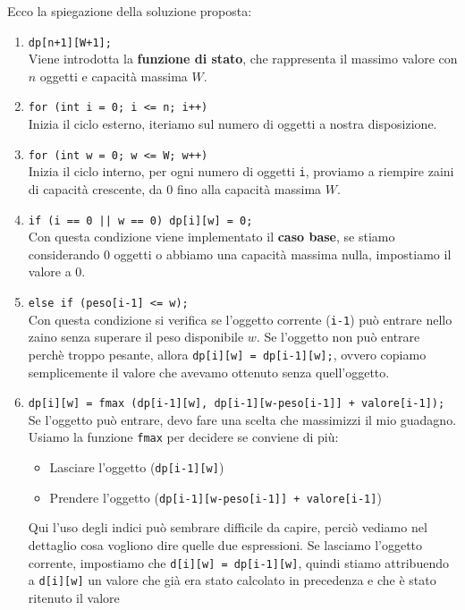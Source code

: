 \noindent Ecco la spiegazione della soluzione proposta:
\begin{enumerate}
    \item \texttt{dp[n+1][W+1];}\\
    Viene introdotta la \textbf{funzione di stato}, che rappresenta il massimo valore con $n$ oggetti
    e capacità massima $W$.
    \item \texttt{for (int i = 0; i <= n; i++)}\\ 
    Inizia il ciclo esterno, iteriamo sul numero di oggetti a nostra disposizione.
    \item \texttt{for (int w = 0; w <= W; w++)}\\ %
    Inizia il ciclo interno, per ogni numero di oggetti \texttt{i}, proviamo a
    riempire zaini di capacità crescente, da $0$ fino alla capacità massima $W$.
    \item \texttt{if (i == 0 || w == 0)
                        dp[i][w] = 0;}\\
    Con questa condizione viene implementato il \textbf{caso base}, se stiamo considerando $0$ oggetti o abbiamo una capacità massima nulla, impostiamo il valore a $0$.
    \item \texttt{else if (peso[i-1] <= w);}\\
    Con questa condizione si verifica se l'oggetto corrente (\texttt{i-1}) può entrare nello zaino senza superare il peso disponibile $w$.
    Se l'oggetto non può entrare perchè troppo pesante, allora \texttt{dp[i][w] = dp[i-1][w];}, ovvero copiamo semplicemente il valore che avevamo ottenuto senza quell'oggetto.
    \item \texttt{dp[i][w] = fmax (dp[i-1][w], dp[i-1][w-peso[i-1]] + valore[i-1]);}\\
    Se l'oggetto può entrare, devo fare una scelta che massimizzi il mio guadagno. Usiamo la funzione \texttt{fmax} per decidere se conviene di più:
                \begin{itemize}
                    \item Lasciare l'oggetto (\texttt{dp[i-1][w]})
                    \item Prendere l'oggetto (\texttt{dp[i-1][w-peso[i-1]] + valore[i-1]})
                \end{itemize}
    Qui l'uso degli indici può sembrare difficile da capire, perciò vediamo nel dettaglio cosa vogliono dire quelle due espressioni.
     Se lasciamo l'oggetto corrente, impostiamo che \texttt{d[i][w] = dp[i-1][w]}, quindi stiamo attribuendo a \texttt{d[i][w]} un valore che già era stato calcolato in precedenza e che è stato ritenuto il valore

\end{enumerate}
